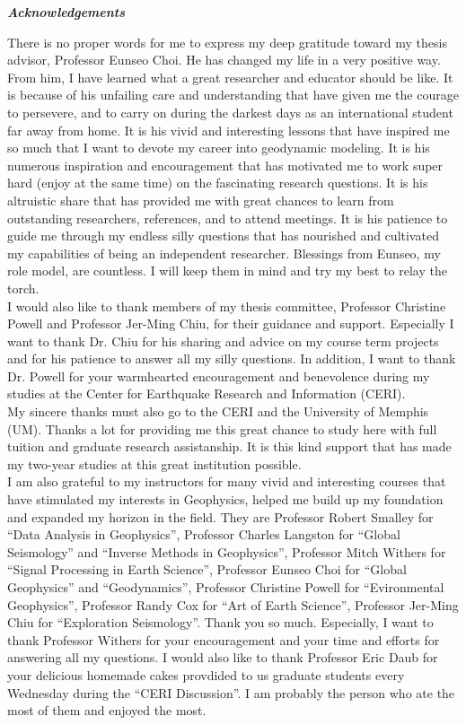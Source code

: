 \begin{center}
\textbf{\textit{\large{Acknowledgements}}}
\end{center}

There is no proper words for me to express my deep gratitude toward my thesis advisor, Professor Eunseo Choi. He has changed my life in a very positive way. From him, I have learned what a great researcher and educator should be like. It is because of his unfailing care and understanding that have given me the courage to persevere, and to carry on during the darkest days as an international student far away from home. It is his vivid and interesting lessons that have inspired me so much that I want to devote my career into geodynamic modeling. It is his numerous inspiration and encouragement that has motivated me to work super hard (enjoy at the same time) on the fascinating research questions. It is his altruistic share that has provided me with great chances to learn from outstanding researchers, references, and to attend meetings. It is his patience to guide me through my endless silly questions that has nourished and cultivated my capabilities of being an independent researcher. Blessings from Eunseo, my role model, are countless. I will keep them in mind and try my best to relay the torch.
\\
I would also like to thank members of my thesis committee, Professor Christine Powell and Professor Jer-Ming Chiu, for their guidance and support. Especially I want to thank Dr. Chiu for his sharing and advice on my course term projects and for his patience to answer all my silly questions. In addition, I want to thank Dr. Powell for your warmhearted encouragement and benevolence during my studies at the Center for Earthquake Research and Information (CERI). 
\\
My sincere thanks must also go to the CERI and the University of Memphis (UM). Thanks a lot for providing me this great chance to study here with full tuition and graduate research assistanship. It is this kind support that has made my two-year studies at this great institution possible. 
\\
I am also grateful to my instructors for many vivid and interesting courses that have stimulated my interests in Geophysics, helped me build up my foundation and expanded my horizon in the field. They are Professor Robert Smalley for ``Data Analysis in Geophysics'', Professor Charles Langston for ``Global Seismology'' and ``Inverse Methods in Geophysics'', Professor Mitch Withers for ``Signal Processing in Earth Science'', Professor Eunseo Choi for ``Global Geophysics'' and ``Geodynamics'', Professor Christine Powell for ``Evironmental Geophysics'', Professor Randy Cox for ``Art of Earth Science'', Professor Jer-Ming Chiu for ``Exploration Seismology''. Thank you so much. Especially, I want to thank Professor Withers for your encouragement and your time and efforts for answering all my questions. I would also like to thank Professor Eric Daub for your delicious homemade cakes provdided to us graduate students every Wednesday during the ``CERI Discussion''. I am probably the person who ate the most of them and enjoyed the most.
